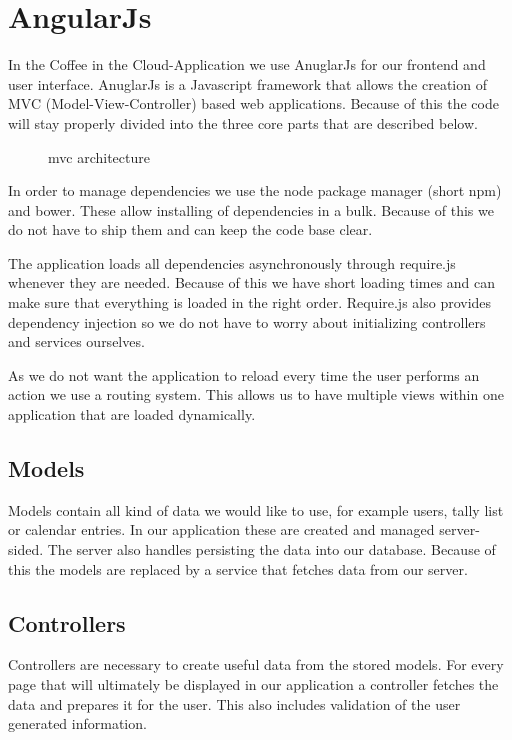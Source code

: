 \newpage
\section{AngularJs}\label{angularjs}

In the Coffee in the Cloud-Application we use AnuglarJs for our frontend
and user interface. AnuglarJs is a Javascript framework that allows the
creation of MVC (Model-View-Controller) based web applications. Because
of this the code will stay properly divided into the three core parts
that are described below.

\begin{figure}[htbp]
\centering
{}
\caption{mvc architecture}
\end{figure}

In order to manage dependencies we use the node package manager (short
npm) and bower. These allow installing of dependencies in a bulk.
Because of this we do not have to ship them and can keep the code base
clear.

The application loads all dependencies asynchronously through require.js
whenever they are needed. Because of this we have short loading times
and can make sure that everything is loaded in the right order.
Require.js also provides dependency injection so we do not have to worry
about initializing controllers and services ourselves.

As we do not want the application to reload every time the user performs
an action we use a routing system. This allows us to have multiple views
within one application that are loaded dynamically.

\subsection{Models}\label{models}

Models contain all kind of data we would like to use, for example users,
tally list or calendar entries. In our application these are created and
managed server-sided. The server also handles persisting the data into
our database. Because of this the models are replaced by a service that
fetches data from our server.

\subsection{Controllers}\label{controllers}

Controllers are necessary to create useful data from the stored models.
For every page that will ultimately be displayed in our application a
controller fetches the data and prepares it for the user. This also
includes validation of the user generated information.

